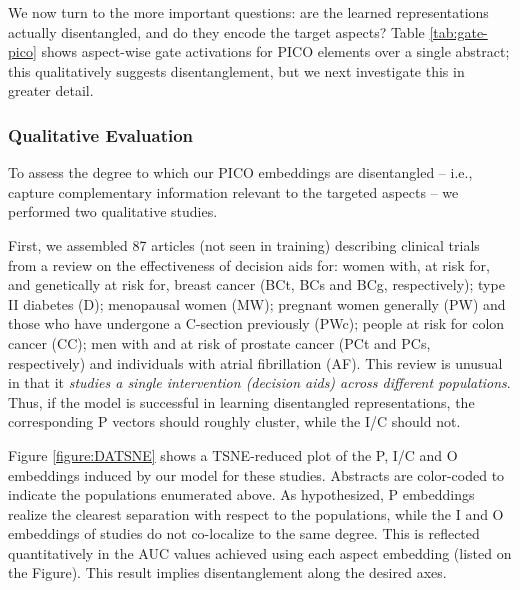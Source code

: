 \documentclass[11pt,a4paper]{article}
\begin{document}
We now turn to the more important questions: are the learned representations actually disentangled, and do they encode the target aspects? Table \ref{tab:gate-pico} shows aspect-wise gate activations for PICO elements over a single abstract; this qualitatively suggests disentanglement, but we next investigate this in greater detail.


\vspace{-.1em}
\subsubsection{Qualitative Evaluation} 
\vspace{-.1em}
To assess the degree to which our PICO embeddings are disentangled -- i.e., capture complementary information relevant to the targeted aspects -- we performed two qualitative studies.

First, we assembled 87 articles (not seen in training) describing clinical trials from a review on the effectiveness of decision aids \cite{o2009decision} for: women with, at risk for, and genetically at risk for, breast cancer (BCt, BCs and BCg, respectively); type II diabetes (D); menopausal women (MW); pregnant women generally (PW) and those who have undergone a C-section previously (PWc); people at risk for colon cancer (CC); men with and at risk of prostate cancer (PCt and PCs, respectively) and individuals with atrial fibrillation (AF). This review is unusual in that it \emph{studies a single intervention (decision aids) across different populations}. Thus, if the model is successful in learning disentangled representations, the corresponding P vectors should roughly cluster, while the I/C should not. 

Figure \ref{figure:DATSNE} shows a TSNE-reduced plot of the P, I/C and O embeddings induced by our model for these studies. Abstracts are color-coded to indicate the populations enumerated above. As hypothesized, P embeddings realize the clearest separation with respect to the populations, while the I and O embeddings of studies do not co-localize to the same degree. This is reflected quantitatively in the AUC values achieved using each aspect embedding (listed on the Figure). This result implies disentanglement along the desired axes.
\end{document}
